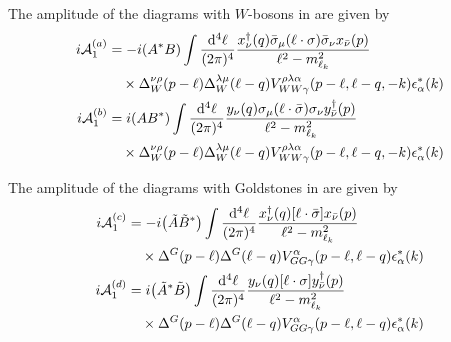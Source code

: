 The amplitude of the diagrams with \(W\)-bosons in  are given by
\begin{align}
	i\mathcal{A}^{(a)}_{1}
	 & =
	-i\qty(A^{*}B)
	\int\frac{\dd[4]{\ell}}{(2\pi)^{4}}
	\frac{x_{\nu}^{\dagger}(q)\bar{\sigma}_{\mu}\qty(\ell\cdot\sigma)\bar{\sigma}_{\nu}x_{\bar{\nu}}(p)}{\ell^{2}-m_{\ell_{k}}^{2}} \\
	 & \quad \times
	\Delta^{\nu\rho}_{W}(p-\ell)
	\Delta^{\lambda\mu}_{W}(\ell-q)
	V^{\rho\lambda\alpha}_{WW\gamma}(p-\ell,\ell-q,-k)
	\epsilon^{*}_{\alpha}(k)
	\notag                                                                                                                     \\
	i\mathcal{A}^{(b)}_{1}
	 & =
	i\qty(AB^{*})
	\int\frac{\dd[4]{\ell}}{(2\pi)^{4}}
	\frac{y_{\nu}(q)\sigma_{\mu}\qty(\ell\cdot\bar{\sigma})\sigma_{\nu}y^{\dagger}_{\bar{\nu}}(p) }{\ell^{2}-m_{\ell_{k}}^{2}}      \\
	 & \quad \times
	\Delta^{\nu\rho}_{W}(p-\ell)
	\Delta^{\lambda\mu}_{W}(\ell-q)
	V^{\rho\lambda\alpha}_{WW\gamma}(p-\ell,\ell-q,-k)
	\epsilon^{*}_{\alpha}(k)
	\notag
\end{align}


The amplitude of the diagrams with Goldstones in  are given by
\begin{align}
	i\mathcal{A}^{(c)}_{1}
	 & =
	-i\qty(\tilde{A}\tilde{B}^{*})
	\int\frac{\dd[4]{\ell}}{(2\pi)^{4}}
	\frac{x_{\nu}^{\dagger}(q)\qty[\ell\cdot\bar{\sigma}]x_{\bar{\nu}}(p)}{\ell^{2}-m_{\ell_{k}}^{2}}
	\\
	 & \quad \times
	\Delta^{G}(p-\ell)
	\Delta^{G}(\ell-q)
	V^{\alpha}_{GG\gamma}(p-\ell,\ell-q)
	\epsilon^{*}_{\alpha}(k)
	\notag          \\
	i\mathcal{A}^{(d)}_{1}
	 & =
	i\qty(\tilde{A}^{*}\tilde{B})
	\int\frac{\dd[4]{\ell}}{(2\pi)^{4}}
	\frac{y_{\nu}(q)\qty[\ell\cdot\sigma]y^{\dagger}_{\bar{\nu}}(p)}{\ell^{2}-m_{\ell_{k}}^{2}}
	\\
	 & \quad \times
	\Delta^{G}(p-\ell)
	\Delta^{G}(\ell-q)
	V^{\alpha}_{GG\gamma}(p-\ell,\ell-q)
	\epsilon^{*}_{\alpha}(k)
	\notag
\end{align}



